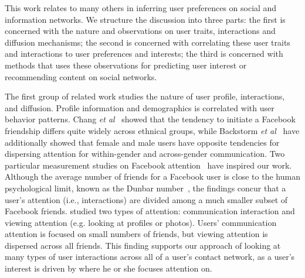 

This work relates to many others in inferring user preferences on social and information networks. 
We structure the discussion into three parts: the first is concerned with the nature and observations on user traits, interactions and diffusion mechanisms; the second is concerned with correlating these user traits and interactions to user preferences and interests; %
the third is concerned with methods that uses these observations for predicting user interest or recommending content on social networks.

The first group of related work studies the nature of user profile, interactions, and diffusion.
Profile information and demographics is correlated with user behavior
patterns. Chang {\it et al}~\cite{Chang2010ethnicity} showed that the tendency to
initiate a Facebook friendship differs quite widely across ethnical
groups, while Backstorm {\it et al}~\cite{backstrom2011center} have additionally showed that female and male users have opposite tendencies for dispersing attention for within-gender and across-gender communication.
Two particular measurement studies on Facebook attention~\cite{backstrom2011center,wilson2009user} have inspired our work.  Although the average number of friends for a Facebook user is close to the human psychological limit, known as the Dunbar number~\cite{hill2003social}, the findings concur that a user's attention (i.e., interactions) are divided among a much smaller subset of Facebook friends. \cite{backstrom2011center} studied two types of attention: communication interaction and viewing attention (e.g. looking at profiles or photos). Users' communication attention is focused on small numbers of friends, but viewing attention is dispersed across all friends.
This finding supports our approach of looking at many types of user interactions across all of a user's contact network, as a user's interest is driven by where he or she focuses attention on.

